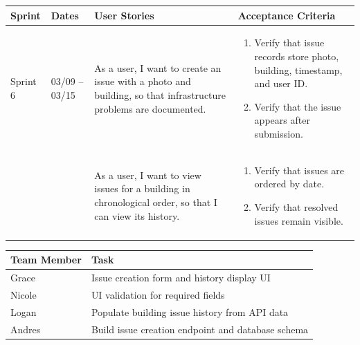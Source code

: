 \documentclass[12pt]{article}
\begin{document}
\vspace{2em}


\vspace{0.5em}

\noindent
\begin{tabular}{|L{1.2cm}|L{1.8cm}|L{5.2cm}|L{6.3cm}|}
\hline
\textbf{Sprint} & \textbf{Dates} & \textbf{User Stories} & \textbf{Acceptance Criteria} \\
\hline
Sprint 6 & 03/09 -- 03/15 &
As a user, I want to create an issue with a photo and building, so that infrastructure problems are documented. &
\begin{enumerate}
    \item Verify that issue records store photo, building, timestamp, and user ID.
    \item Verify that the issue appears after submission.
\end{enumerate} \\
& &
As a user, I want to view issues for a building in chronological order, so that I can view its history. &
\begin{enumerate}
    \item Verify that issues are ordered by date.
    \item Verify that resolved issues remain visible.
\end{enumerate} \\
\hline
\end{tabular}

\vspace{0.5em}

\noindent
\begin{tabular}{|L{2.5cm}|L{12.5cm}|}
\hline
\textbf{Team Member} & \textbf{Task} \\
\hline
Grace & Issue creation form and history display UI \\
\hline
Nicole & UI validation for required fields \\
\hline
Logan & Populate building issue history from API data \\
\hline
Andres & Build issue creation endpoint and database schema \\
\hline
\end{tabular}

\vspace{2em}

\end{document}
